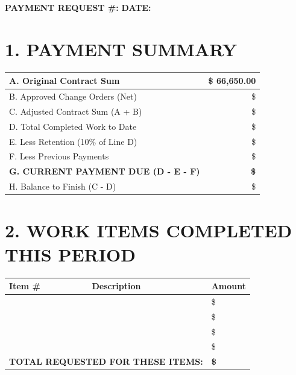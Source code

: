 \documentclass[10pt,letterpaper]{article}
\begin{document}
\vspace{0.5em}

\noindent\textbf{PAYMENT REQUEST \#:} \underline{\hspace{2cm}} \hspace{1cm} \textbf{DATE:} \underline{\hspace{2cm}}

\section*{1. PAYMENT SUMMARY}
\vspace{-0.5em}
{\small
\begin{tabularx}{\textwidth}{|X|r|}
\hline
A. Original Contract Sum & \$ 66,650.00 \\
\hline
B. Approved Change Orders (Net) & \$ \underline{\hspace{2.5cm}} \\
\hline
C. Adjusted Contract Sum (A + B) & \$ \underline{\hspace{2.5cm}} \\
\hline
D. Total Completed Work to Date & \$ \underline{\hspace{2.5cm}} \\
\hline
E. Less Retention (10\% of Line D) & \$ \underline{\hspace{2.5cm}} \\
\hline
F. Less Previous Payments & \$ \underline{\hspace{2.5cm}} \\
\hline
\textbf{G. CURRENT PAYMENT DUE (D - E - F)} & \textbf{\$} \underline{\hspace{2.5cm}} \\
\hline
H. Balance to Finish (C - D) & \$ \underline{\hspace{2.5cm}} \\
\hline
\end{tabularx}
}

\section*{2. WORK ITEMS COMPLETED THIS PERIOD}
\vspace{-0.5em}

{\small
\begin{tabularx}{\textwidth}{|l|X|l|}
\hline
\textbf{Item \#} & \textbf{Description} & \textbf{Amount} \\
\hline
\hspace{0.8cm} & & \$ \\
\hline
\hspace{0.8cm} & & \$ \\
\hline
\hspace{0.8cm} & & \$ \\
\hline
\hspace{0.8cm} & & \$ \\
\hline
\multicolumn{2}{|r|}{\textbf{TOTAL REQUESTED FOR THESE ITEMS:}} & \textbf{\$} \\
\hline
\end{tabularx}
}
\end{document}
